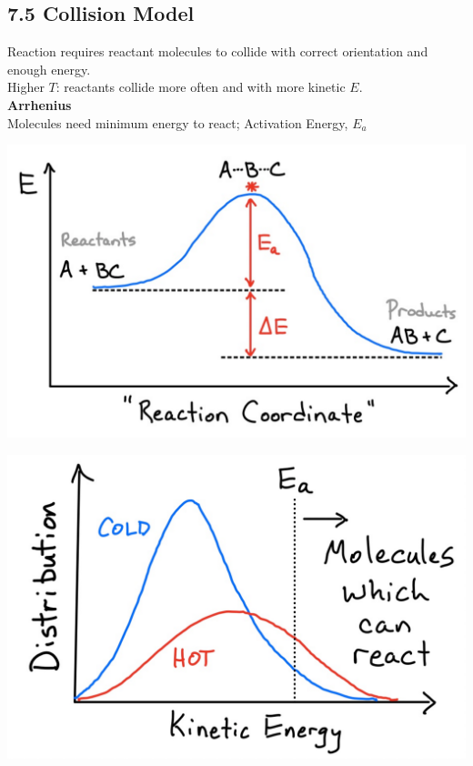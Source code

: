 \subsection{7.5 Collision Model}
    Reaction requires reactant molecules to collide with correct orientation and enough energy.\\
    Higher $T$: reactants collide more often and with more kinetic $E$.\\
    \textbf{Arrhenius}\\
    Molecules need minimum energy to react; Activation Energy, $E_a$\\
    \begin{minipage}{0.99\linewidth}
        \begin{minipage}{0.49\linewidth}
            \centerline{\includegraphics[width=0.8\linewidth]{src/7_Kinetics/images/activation_energy.pdf}}
        \end{minipage}
        \begin{minipage}{0.49\linewidth}
            \centerline{\includegraphics[width=0.8\linewidth]{src/7_Kinetics/images/distribution.pdf}}
        \end{minipage}
    \end{minipage}
    
    